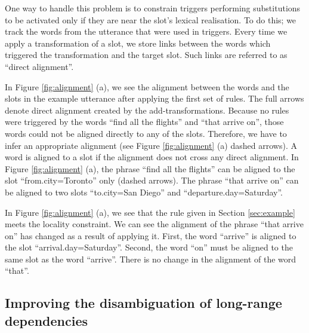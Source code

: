 \documentclass{article}
\begin{document}
One way to handle this problem is to constrain triggers performing substitutions to be activated only if they are near the slot's lexical realisation. To do this; we track the words from the utterance that were used in triggers. Every time we apply a transformation of a slot, we store links between the words which triggered the transformation and the target slot. Such links are referred to as ``direct alignment''. 


In Figure \ref{fig:alignment} (a), we see the alignment between the words and the slots in the example utterance after applying the first set of rules. The full arrows denote direct alignment created by the add-transformations. Because no rules were triggered by the words ``find all the flights'' and ``that arrive on'', those words could not be aligned directly to any of the slots. Therefore, we have to infer an appropriate alignment (see Figure \ref{fig:alignment} (a) dashed arrows). A word is aligned to a slot if the alignment does not cross any direct alignment.
In Figure \ref{fig:alignment} (a), the phrase ``find all the flights'' can be aligned to the slot ``from.city=Toronto'' only (dashed arrows). The phrase ``that arrive on'' can be aligned to two slots ``to.city=San Diego'' and ``departure.day=Saturday''. 

In Figure \ref{fig:alignment} (a), we see that the rule given in Section \ref{sec:example} meets the locality constraint. We can see the alignment of the phrase ``that arrive on'' has changed as a result of applying it. First, the word ``arrive'' is aligned to the slot ``arrival.day=Saturday''. Second, the word ``on'' must be aligned to the same slot as the word ``arrive''. There is no change in the alignment of the word ``that''.

\subsection{Improving the disambiguation of long-range dependencies}
\label{sec:dep:trees}
\end{document}

